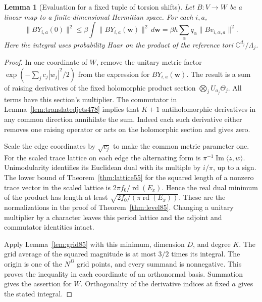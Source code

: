 \documentclass[a4paper,11pt]{article}
\newtheorem{lemma}[proposition]{Lemma}
\theoremstyle{definition}
\theoremstyle{remark}
\numberwithin{equation}{section}
\begin{document}
\begin{lemma}[Evaluation for a fixed tuple of torsion shifts]\leavevmode
\label{lem:singleshift479}
Let \(B:V\to W\) be a linear map to a finite-dimensional
Hermitian space. For each \(i,a\),
\[
 \|BY_{i,a}(0)\|^2\le
 \beta\int\|BY_{i,a}(\boldsymbol w)\|^2\,d\boldsymbol w
   =\beta h\sum_\alpha q_\alpha\|Bv_{i,\alpha,a}\|^2 .
\]
Here the integral uses probability Haar on the product of the
reference tori \(\mathbb C^{d_j}/\Lambda_j\).
\end{lemma}
\begin{proof}
In one coordinate of \(W\), remove the unitary metric factor
\(\exp(-\sum_j c_j|w_j|^2/2)\) from the expression for
\(BY_{i,a}(\boldsymbol w)\). The result is a sum of raising
derivatives of the fixed holomorphic product section
\(\bigotimes_j U_{a_j}\Theta_j\). All terms have this section's
multiplier. The commutator in Lemma~\ref{lem:translatedjets478}
implies that \(K+1\) antiholomorphic derivatives in any common
direction annihilate the sum. Indeed each such derivative either
removes one raising operator or acts on the holomorphic section
and gives zero.

Scale the edge coordinates by \(\sqrt{c_j}\) to make the common
metric parameter one. For the scaled trace lattice on each edge
the alternating form is
\(\pi^{-1}\operatorname{Im}\langle z,w\rangle\).
Unimodularity identifies its Euclidean dual with its multiple
by \(i/\pi\), up to a sign. The lower bound of
Theorem~\ref{thm:lattice55} for the squared length of a nonzero
trace vector in the scaled lattice is
\(2\pi f_0/\operatorname{rd}(E_x)\). Hence the real dual minimum
of the product has length at least
\(\sqrt{2f_0/(\pi\operatorname{rd}(E_x))}\). These are the
normalizations in the proof of Theorem~\ref{thm:level85}.
Changing a unitary multiplier by a character leaves this period
lattice and the adjoint and commutator identities intact.

Apply Lemma~\ref{lem:grid85} with this minimum, dimension \(D\),
and degree \(K\). The grid average of the squared magnitude is
at most \(3/2\) times its integral. The origin is one of the
\(N^D\) grid points, and every summand is nonnegative. This proves
the inequality in each coordinate of an orthonormal basis.
Summation gives the assertion for \(W\). Orthogonality of the
derivative indices at fixed \(a\) gives the stated integral.
\end{proof}
\end{document}
